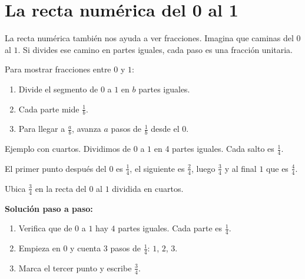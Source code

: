 \section{La recta numérica del 0 al 1}

La recta numérica también nos ayuda a ver fracciones. Imagina que caminas del $0$ al $1$. Si divides ese camino en partes iguales, cada paso es una fracción unitaria.

\begin{wbidea}
Para mostrar fracciones entre $0$ y $1$:
\begin{enumerate}
\item Divide el segmento de $0$ a $1$ en $b$ partes iguales.
\item Cada parte mide $\frac{1}{b}$.
\item Para llegar a $\frac{a}{b}$, avanza $a$ pasos de $\frac{1}{b}$ desde el $0$.
\end{enumerate}
\end{wbidea}

Ejemplo con cuartos. Dividimos de $0$ a $1$ en 4 partes iguales. Cada salto es $\frac{1}{4}$.

\begin{center}
\end{center}

El primer punto después del $0$ es $\frac{1}{4}$, el siguiente es $\frac{2}{4}$, luego $\frac{3}{4}$ y al final $1$ que es $\frac{4}{4}$.

\begin{wbexample}
Ubica $\frac{3}{4}$ en la recta del $0$ al $1$ dividida en cuartos.

\begin{center}
\end{center}

\textbf{Solución paso a paso:}
\begin{enumerate}
\item Verifica que de $0$ a $1$ hay $4$ partes iguales. Cada parte es $\frac{1}{4}$.
\item Empieza en $0$ y cuenta 3 pasos de $\frac{1}{4}$: $1$, $2$, $3$.
\item Marca el tercer punto y escribe $\frac{3}{4}$.
\end{enumerate}
\begin{center}
\end{center}
\end{wbexample}

